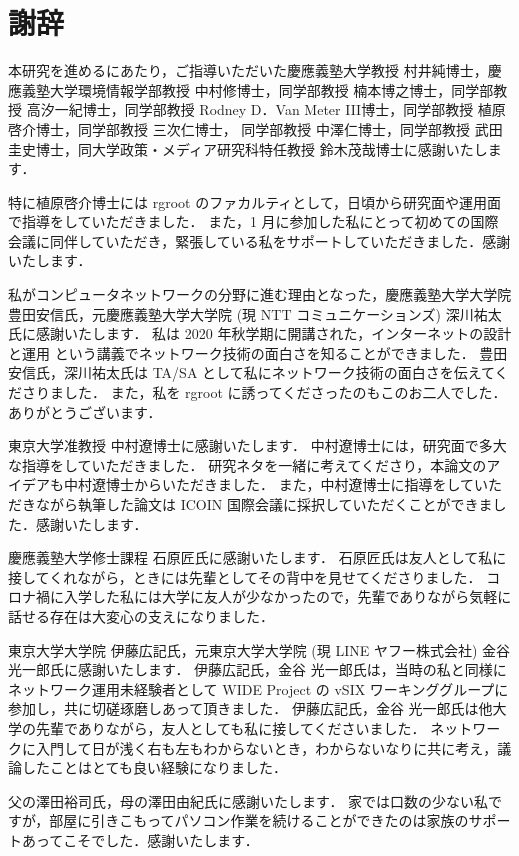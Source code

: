 \chapter*{謝辞}
\label{thanks}
本研究を進めるにあたり，ご指導いただいた慶應義塾大学教授 村井純博士，慶應義塾大学環境情報学部教授 中村修博士，同学部教授 楠本博之博士，同学部教授 高汐一紀博士，同学部教授 Rodney D．Van Meter III博士，同学部教授 植原啓介博士，同学部教授 三次仁博士，
同学部教授 中澤仁博士，同学部教授 武田圭史博士，同大学政策・メディア研究科特任教授 鈴木茂哉博士に感謝いたします．

特に植原啓介博士には rgroot のファカルティとして，日頃から研究面や運用面で指導をしていただきました．
また，1 月に参加した私にとって初めての国際会議に同伴していただき，緊張している私をサポートしていただきました．感謝いたします．

私がコンピュータネットワークの分野に進む理由となった，慶應義塾大学大学院 豊田安信氏，元慶應義塾大学大学院 (現 NTT コミュニケーションズ) 深川祐太氏に感謝いたします．
私は 2020 年秋学期に開講された，インターネットの設計と運用 という講義でネットワーク技術の面白さを知ることができました．
豊田安信氏，深川祐太氏は TA/SA として私にネットワーク技術の面白さを伝えてくださりました．
また，私を rgroot に誘ってくださったのもこのお二人でした．
ありがとうございます．

東京大学准教授 中村遼博士に感謝いたします．
中村遼博士には，研究面で多大な指導をしていただきました．
研究ネタを一緒に考えてくださり，本論文のアイデアも中村遼博士からいただきました．
また，中村遼博士に指導をしていただきながら執筆した論文は ICOIN 国際会議に採択していただくことができました．感謝いたします．

慶應義塾大学修士課程 石原匠氏に感謝いたします．
石原匠氏は友人として私に接してくれながら，ときには先輩としてその背中を見せてくださりました．
コロナ禍に入学した私には大学に友人が少なかったので，先輩でありながら気軽に話せる存在は大変心の支えになりました．

東京大学大学院 伊藤広記氏，元東京大学大学院 (現 LINE ヤフー株式会社) 金谷 光一郎氏に感謝いたします．
伊藤広記氏，金谷 光一郎氏は，当時の私と同様にネットワーク運用未経験者として WIDE Project の vSIX ワーキンググループに参加し，共に切磋琢磨しあって頂きました．
伊藤広記氏，金谷 光一郎氏は他大学の先輩でありながら，友人としても私に接してくださいました．
ネットワークに入門して日が浅く右も左もわからないとき，わからないなりに共に考え，議論したことはとても良い経験になりました．

父の澤田裕司氏，母の澤田由紀氏に感謝いたします．
家では口数の少ない私ですが，部屋に引きこもってパソコン作業を続けることができたのは家族のサポートあってこそでした．感謝いたします．

